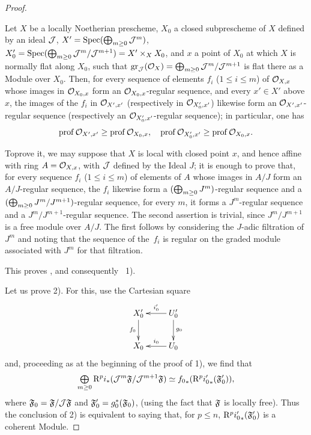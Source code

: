 \begin{proof}
\begin{lemme} \label{XII.4.2}
Let $X$ be a locally Noetherian prescheme, $X_0$ a closed subprescheme of $X$ defined by an ideal $\Jj$, $X'=\Spec(\sisi{\coprod}{\bigoplus}_{m\geq 0} \Jj^m)$, $X_0'=\Spec(\sisi{\coprod}{\bigoplus}_{m\geq 0} \Jj^m/\Jj^{m+1}) = X'\times_XX_0$, and $x$ a point of $X_0$ at which $X$ is normally flat along $X_0$, \ie such that $\gr_{\Jj}(\OX)= \sisi{\coprod}{\bigoplus}_{m\geq 0}\Jj^m/\Jj^{m+1}$ is flat there as a Module over $X_0$. Then, for every sequence of elements $f_i$ ($1\leq i\leq m$) of $\Oo_{X, x}$ whose images in $\Oo_{X_0, x}$ form an $\Oo_{X_0, x}$-regular sequence, and every $x'\in X'$ above $x$, the images of the $f_i$ in $\Oo_{X', x'}$ (respectively in $\Oo_{X'_0, x'}$) likewise form an $\Oo_{X', x'}$-regular sequence (respectively an $\Oo_{X'_0, x'}$-regular sequence); in particular, one has
\steco
\begin{equation} \label{eq:XII.23}
\prof \Oo_{X', x'} \geq \prof \Oo_{X_0, x}, \quad \prof \Oo_{X'_0, x'} \geq \prof \Oo_{X_0, x}.
\end{equation}
\end{lemme}

To\pageoriginale prove it, we may suppose that $X$ is local with closed point $x$, and hence affine with ring $A=\Oo_{X, x}$, with $\Jj$ defined by the Ideal $J$; it is enough to prove that, for every sequence $f_i$ ($1\leq i\leq m$) of elements of $A$ whose images in $A/J$ form an $A/J$-regular sequence, the $f_i$ likewise form a $(\sisi{\coprod}{\bigoplus}_{m\geq 0} J^m)$-regular sequence and a $(\sisi{\coprod}{\bigoplus}_{m\geq 0} J^m/J^{m+1})$-regular sequence, \ie for every $m$, it forms a $J^m$-regular sequence and a $J^m/J^{m+1}$-regular sequence. The second assertion is trivial, since $J^m/J^{m+1}$ is a free module over $A/J$. The first follows by considering the $J$-adic filtration of $J^m$ and noting that the sequence of the~$f_i$ is regular on the graded module associated with $J^m$ for that filtration.

This proves , and consequently ~1\sisi{\noo}{}).

Let us prove  2\sisi{\noo}{}). For this, use the Cartesian square
\[
\xymatrix{
X'_0\ar[d]_{f_0}&\ar[l]_-{i'_0} U'_0\ar[d]^{g_0} \\
X_0&\ar[l]_-{i_0} U_0
}
\]
and, proceeding as at the beginning of the proof of 1\sisi{\noo}{}), we find that
\steco
\begin{equation} \label{eq:XII.24}
\sisi{\coprod}{\tbigoplus}_{m\geq 0} \R^pi_\ast(\Jj^m\formelF/\Jj^{m+1}\formelF) \simeq {f_0}_\ast (\R^p{\sisi{i}{i'}_0}_\ast(\formelF_0')),
\end{equation}
where $\formelF_0=\formelF/\Jj\formelF$ and $\formelF_0'=g_0^\ast(\formelF_0)$, (using the fact that $\formelF$ is locally free). Thus the conclusion of 2\sisi{\noo}{}) is equivalent to saying that, for $p\leq n$, $\R^p{i'_0}_\ast(\formelF_0')$ is a coherent Module.


\end{proof}
